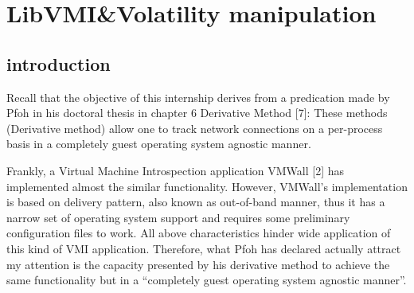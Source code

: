 
\chapter{LibVMI\&Volatility manipulation} %

\label{Chapter7} %



\section{introduction}
Recall that the objective of this internship derives from a predication made by Pfoh in his doctoral thesis in chapter 6 Derivative Method [7]: 
These methods (Derivative method) allow one to track network connections on a per-process basis in a completely guest operating system agnostic manner.

Frankly, a Virtual Machine Introspection application VMWall [2] has implemented almost the similar functionality. 
However, VMWall’s implementation is based on delivery pattern, also known as out-of-band manner, 
thus it has a narrow set of operating system support and requires some preliminary configuration files to work. 
All above characteristics hinder wide application of this kind of VMI application. Therefore, what Pfoh has declared actually 
attract my attention is the capacity presented by his derivative method to achieve the same functionality but in a 
“completely guest operating system agnostic manner”.

